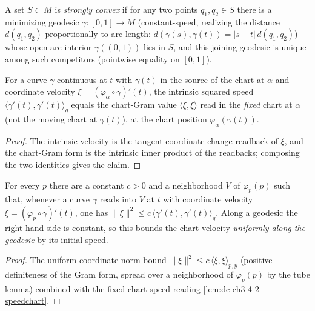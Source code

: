 \begin{definition}
  \label{def:dc-ch3-4-2-stronglyconvex}
  \leanok
  A set $S\subset M$ is \emph{strongly convex} if for any two points $q_1,q_2\in\overline{S}$
  there is a minimizing geodesic $\gamma:[0,1]\to M$ (constant-speed, realizing the distance
  $d(q_1,q_2)$ proportionally to arc length: $d(\gamma(s),\gamma(t))=|s-t|\,d(q_1,q_2)$) whose
  open-arc interior $\gamma((0,1))$ lies in $S$, and this joining geodesic is unique among such
  competitors (pointwise equality on $[0,1]$).
\end{definition}

\begin{lemma}
  \label{lem:dc-ch3-4-2-speedchart}
  \leanok
  For a curve $\gamma$ continuous at $t$ with $\gamma(t)$ in the source of the chart at $\alpha$ and
  coordinate velocity $\xi=(\varphi_\alpha\circ\gamma)'(t)$, the intrinsic squared speed
  $\langle\gamma'(t),\gamma'(t)\rangle_g$ equals the chart-Gram value
  $\langle\xi,\xi\rangle$ read in the \emph{fixed} chart at $\alpha$ (not the moving chart at
  $\gamma(t)$), at the chart position $\varphi_\alpha(\gamma(t))$.
\end{lemma}
\begin{proof}
  \sketch
  \leanok
  The intrinsic velocity is the tangent-coordinate-change readback of $\xi$, and the chart-Gram form
  is the intrinsic inner product of the readbacks; composing the two identities gives the claim.
\end{proof}

\begin{lemma}
  \label{lem:dc-ch3-4-2-velbound}
  \leanok
  For every $p$ there are a constant $c>0$ and a neighborhood $V$ of $\varphi_p(p)$ such that, whenever
  a curve $\gamma$ reads into $V$ at $t$ with coordinate velocity $\xi=(\varphi_p\circ\gamma)'(t)$, one
  has $\|\xi\|^2\le c\,\langle\gamma'(t),\gamma'(t)\rangle_g$. Along a geodesic the right-hand side is
  constant, so this bounds the chart velocity \emph{uniformly along the geodesic} by its initial speed.
\end{lemma}
\begin{proof}
  \sketch
  \leanok
  The uniform coordinate-norm bound $\|\xi\|^2\le c\,\langle\xi,\xi\rangle_{p,y}$ (positive-definiteness
  of the Gram form, spread over a neighborhood of $\varphi_p(p)$ by the tube lemma) combined with the
  fixed-chart speed reading \cref{lem:dc-ch3-4-2-speedchart}.
\end{proof}

